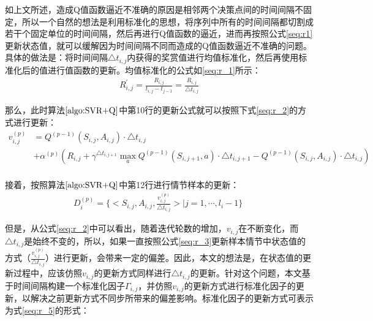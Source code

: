 如上文所述，造成Q值函数逼近不准确的原因是相邻两个决策点间的时间间隔不固定，所以一个自然的想法是利用标准化的思想，将序列中所有的时间间隔都切割成若干个固定单位的时间间隔，然后再进行Q值函数的逼近，进而再按照公式\eqref{seq:r1}更新状态值，就可以缓解因为时间间隔不同而造成的Q值函数逼近不准确的问题。具体的做法是：将时间间隔$\triangle t_{i,j}$内获得的奖赏值进行均值标准化，然后再使用标准化后的值进行值函数的更新。均值标准化的公式如\eqref{seq:r_1}所示：
\begin{equation}\label{seq:r_1}
\begin{aligned}
R_{i, j}^{'}=\frac{R_{i,j}}{t_{i,j}-t_{j-1}}=\frac{R_{i,j}}{\triangle t_{i,j}}
\end{aligned}
\end{equation}

那么，此时算法$\ref{algo:SVR+Q}$中第10行的更新公式就可以按照下式\eqref{seq:r_2}的方式进行更新：
\begin{equation}\label{seq:r_2}
\begin{aligned}
v_{i,j}^{(p)}&=Q^{(p-1)}(S_{i,j},A_{i,j}) \cdot \triangle t_{i,j} \\
&+  \alpha^{(p)} (R_{i,j} + \gamma^{\triangle t_{i,j+1}} \max_{a} Q^{(p-1)}(S_{i,j+1},a) \cdot \triangle t_{i,j+1} -Q^{(p-1)}(S_{i,j},A_{i,j}) \cdot \triangle t_{i,j} )\\
\end{aligned}
\end{equation}

接着，按照算法$\ref{algo:SVR+Q}$中第12行进行情节样本的更新：
\begin{equation}\label{seq:r_3}
\begin{aligned}
D_{i}^{(p)}=\{<S_{i,j}, A_{i,j}, \frac{v_{i,j}^{(p)}}{\triangle t_{i,j}}>|j=1,\cdots,l_{i}-1\}\;
\end{aligned}
\end{equation}

但是，从公式\eqref{seq:r_2}中可以看出，随着迭代轮数的增加，$v_{i,j}$在不断变化，而$\triangle t_{i,j}$是始终不变的，所以，如果一直按照公式\eqref{seq:r_3}更新样本情节中状态值的方式（$\frac{v_{i,j}^{(p)}}{\triangle t_{i,j}}$）进行更新，会带来一定的偏差。因此，本文的想法是，在状态值的更新过程中，应该仿照$v_{i,j}$的更新方式同样进行$\triangle t_{i,j}$的更新。针对这个问题，本文基于时间间隔构建一个标准化因子$\Gamma_{i,j}$，并仿照$v_{i,j}$的更新方式进行标准化因子的更新，以解决之前更新方式不同步所带来的偏差影响。标准化因子的更新方式可表示为式\eqref{seq:r_5}的形式：

